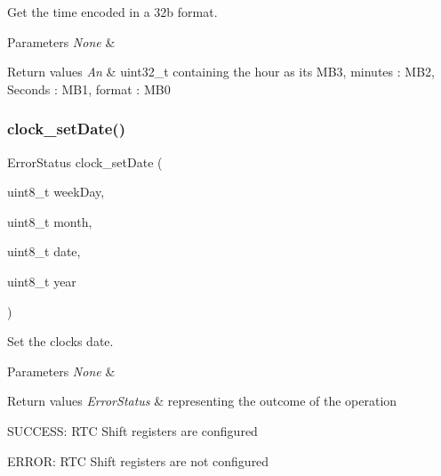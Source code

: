 Get the time encoded in a 32b format. 


\begin{DoxyParams}{Parameters}
{\em None} & \\
\hline
\end{DoxyParams}

\begin{DoxyRetVals}{Return values}
{\em An} & uint32\+\_\+t containing the hour as its M\+B3, minutes \+: M\+B2, Seconds \+: M\+B1, format \+: M\+B0 \\
\hline
\end{DoxyRetVals}
\mbox{\label{group___clock___time___date_gaf16498fa2702bfda6b89a3335ccc7ca6}} 
\subsubsection{\texorpdfstring{clock\+\_\+set\+Date()}{clock\_setDate()}}
{\footnotesize\ttfamily Error\+Status clock\+\_\+set\+Date (\begin{DoxyParamCaption}\item[{uint8\+\_\+t}]{week\+Day,  }\item[{uint8\+\_\+t}]{month,  }\item[{uint8\+\_\+t}]{date,  }\item[{uint8\+\_\+t}]{year }\end{DoxyParamCaption})}



Set the clock\textquotesingle{}s date. 


\begin{DoxyParams}{Parameters}
{\em None} & \\
\hline
\end{DoxyParams}

\begin{DoxyRetVals}{Return values}
{\em Error\+Status} & representing the outcome of the operation
\begin{DoxyItemize}
\item S\+U\+C\+C\+E\+SS\+: R\+TC Shift registers are configured
\item E\+R\+R\+OR\+: R\+TC Shift registers are not configured 
\end{DoxyItemize}\\
\hline
\end{DoxyRetVals}
\mbox{\label{group___clock___time___date_ga11404197d58ddf6b46230bcde4282ef2}} 
